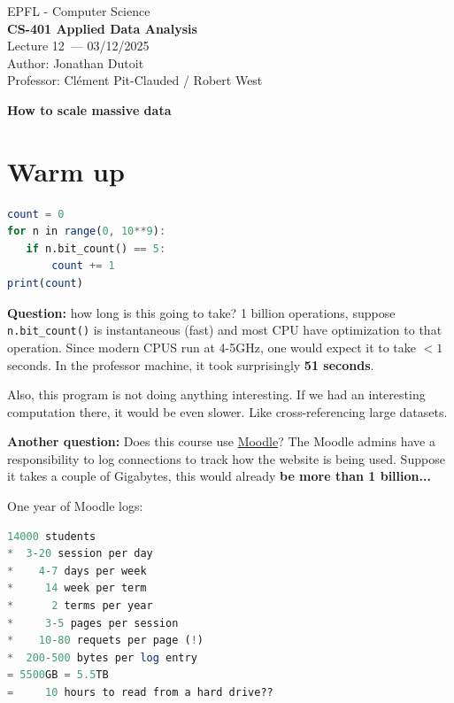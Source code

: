 \documentclass[11pt]{article}
\newcommand{\coursename}{CS-401 Applied Data Analysis}
\newcommand{\lecturenum}{12}
\newcommand{\lecturedate}{03/12/2025}
\newcommand{\professor}{Clément Pit-Clauded / Robert West}
\begin{document}
\begin{center}
  {\large EPFL - Computer Science} \\[0.5em]
  {\Large \textbf{\coursename}} \\[0.5em]
  {\large Lecture \lecturenum\ --- \lecturedate} \\[0.5em]
  {\large Author: Jonathan Dutoit} \\[0.5em]
  {\large Professor: \professor} \\[0.5em]
\end{center}

\vspace{2cm}
\begin{center}
  {\LARGE \textbf{How to scale massive data}}
\end{center}

\vspace{1cm}

\section*{Warm up}

\begin{lstlisting}[language=Octave]
count = 0
for n in range(0, 10**9):
   if n.bit_count() == 5:
       count += 1
print(count)
\end{lstlisting}
\textbf{Question:} how long is this going to take? 1 billion operations, suppose \verb|n.bit_count()| is instantaneous (fast) and most CPU have optimization to that operation. Since modern CPUS run at 4-5GHz, one would expect it to take $< 1$ seconds. In the professor machine, it took surprisingly \textbf{51 seconds}. 

Also, this program is not doing anything interesting. If we had an interesting computation there, it would be even slower. Like cross-referencing large datasets. 

\textbf{Another question:} Does this course use \underline{Moodle}? The Moodle admins have a responsibility to log connections to track how the website is being used. Suppose it takes a couple of Gigabytes, this would already \textbf{be more than 1 billion...}

One year of Moodle logs:
\begin{lstlisting}[language=Octave]
14000 students
*  3-20 session per day
*    4-7 days per week
*     14 week per term
*      2 terms per year
*     3-5 pages per session
*    10-80 requets per page (!)
*  200-500 bytes per log entry
= 5500GB = 5.5TB
=     10 hours to read from a hard drive??
\end{lstlisting}
\end{document}
